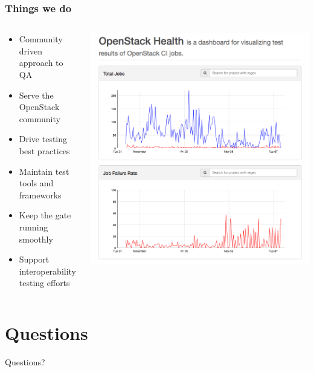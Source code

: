 \documentclass[aspectratio=169,11pt,hyperref={colorlinks=true}]{beamer}
\begin{document}
\begin{frame}
    \frametitle{Things we do}
    \begin{columns}
    \begin{column}{0.5\textwidth}
    \begin{itemize}
        \item{Community driven approach to QA}
        \item{Serve the OpenStack community}
        \item{Drive testing best practices}
        \item{Maintain test tools and frameworks}
        \item{Keep the gate running smoothly}
        \item{Support interoperability testing efforts}
    \end{itemize}
    \end{column}
    \begin{column}{0.5\textwidth}
        \includegraphics[width=1.0\textwidth]{openstack-health.png}
    \end{column}
    \end{columns}
\end{frame}

\section{Questions}
\begin{frame}[c]
    \begin{center}
        \Huge Questions?
    \end{center}
\end{frame}

\end{document}
